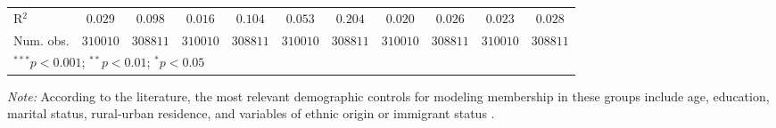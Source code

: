 \begin{table}[htpb]
{\begin{tabular}{l c c c c c c c c c c}
R$^2$                   & $0.029$        & $0.098$        & $0.016$        & $0.104$       & $0.053$       & $0.204$       & $0.020$        & $0.026$        & $0.023$        & $0.028$        \\
Num. obs.               & $310010$       & $308811$       & $310010$       & $308811$      & $310010$      & $308811$      & $310010$       & $308811$       & $310010$       & $308811$       \\
\hline
\multicolumn{11}{l}{\scriptsize{$^{***}p<0.001$; $^{**}p<0.01$; $^{*}p<0.05$}}
\hline
\multicolumn{11}{l}{\scriptsize{$^{***}p<0.001$; $^{**}p<0.01$; $^{*}p<0.05$}} \\
\end{tabular}
}
\vspace{1ex}
\raggedright
\footnotesize\textit{Note:} According to the literature, the most relevant demographic controls for modeling membership in these groups include age, education, marital status, rural-urban residence, and variables of ethnic origin or immigrant status \citep{Badgettetal2021, Carpenteretal2020}.
\end{table}
